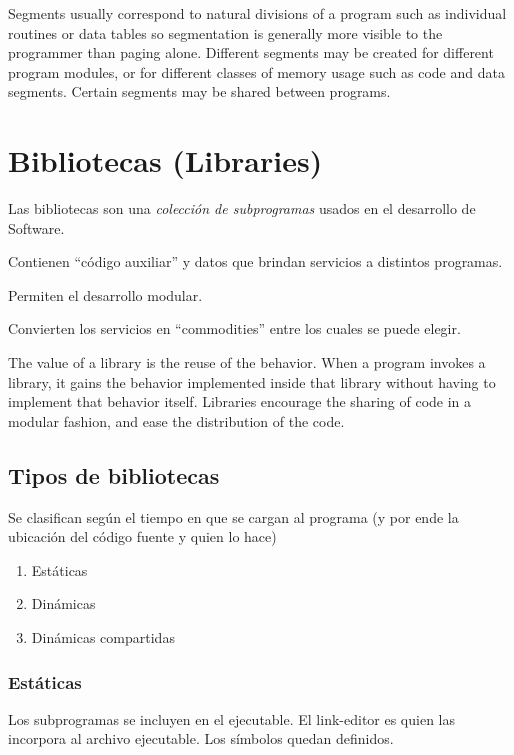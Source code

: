 \documentclass[a4paper, twoside]{article}
\begin{document}
Segments usually correspond to natural divisions of a program such as individual routines or data tables so segmentation is generally more visible to the programmer than paging alone. Different segments may be created for different program modules, or for different classes of memory usage such as code and data segments. Certain segments may be shared between programs.

\newpage
\section{Bibliotecas (Libraries)}
Las bibliotecas son una \emph{colección de subprogramas} usados en el desarrollo de Software.

Contienen “código auxiliar” y datos que brindan servicios a distintos programas.

Permiten el desarrollo modular.

Convierten los servicios en “commodities” entre los cuales se puede elegir.

The value of a library is the reuse of the behavior. When a program invokes a library, it gains the behavior implemented inside that library without having to implement that behavior itself. Libraries encourage the sharing of code in a modular fashion, and ease the distribution of the code.

\subsection{Tipos de bibliotecas}
Se clasifican según el tiempo en que se cargan al programa (y por ende la ubicación del código fuente y quien lo hace)
\begin{enumerate}
	\item Estáticas
	\item Dinámicas
	\item Dinámicas compartidas
\end{enumerate}

\subsubsection{Estáticas}
Los subprogramas se incluyen en el ejecutable. El link-editor es quien las incorpora al archivo ejecutable. Los símbolos quedan definidos.
\end{document}
